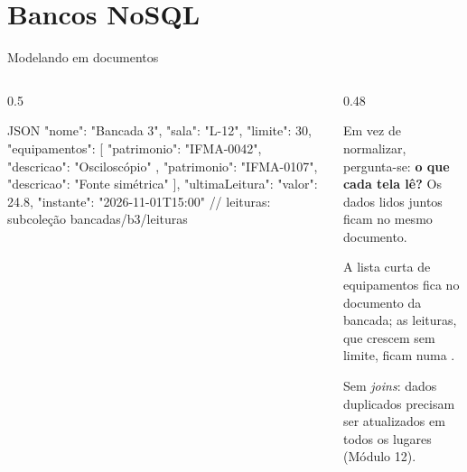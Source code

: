 \documentclass[aspectratio=169,10pt]{beamer}
\begin{document}
\section{Bancos NoSQL}

\begin{frame}[fragile]{Modelando em documentos}
  \begin{columns}[T]
    \begin{column}{0.5\textwidth}
\begin{codigo}[title=Firestore: bancadas/b3]{JSON}
{
  "nome": "Bancada 3",
  "sala": "L-12",
  "limite": 30,
  "equipamentos": [
    { "patrimonio": "IFMA-0042",
      "descricao": "Osciloscópio" },
    { "patrimonio": "IFMA-0107",
      "descricao": "Fonte simétrica" }
  ],
  "ultimaLeitura": { "valor": 24.8,
                     "instante": "2026-11-01T15:00" }
}
// leituras: subcoleção bancadas/b3/leituras
\end{codigo}
    \end{column}
    \begin{column}{0.48\textwidth}
      \begin{conceito}
        Em vez de normalizar, pergunta-se: \textbf{o que cada tela lê?} Os dados lidos juntos ficam no mesmo documento.
      \end{conceito}
      \begin{caixadestaque}
        A lista curta de equipamentos fica  no documento da bancada; as leituras, que crescem sem limite, ficam numa .
      \end{caixadestaque}
      \begin{atencao}
        Sem \emph{joins}: dados duplicados precisam ser atualizados em todos os lugares (Módulo 12).
      \end{atencao}
    \end{column}
  \end{columns}
\end{frame}
\end{document}
